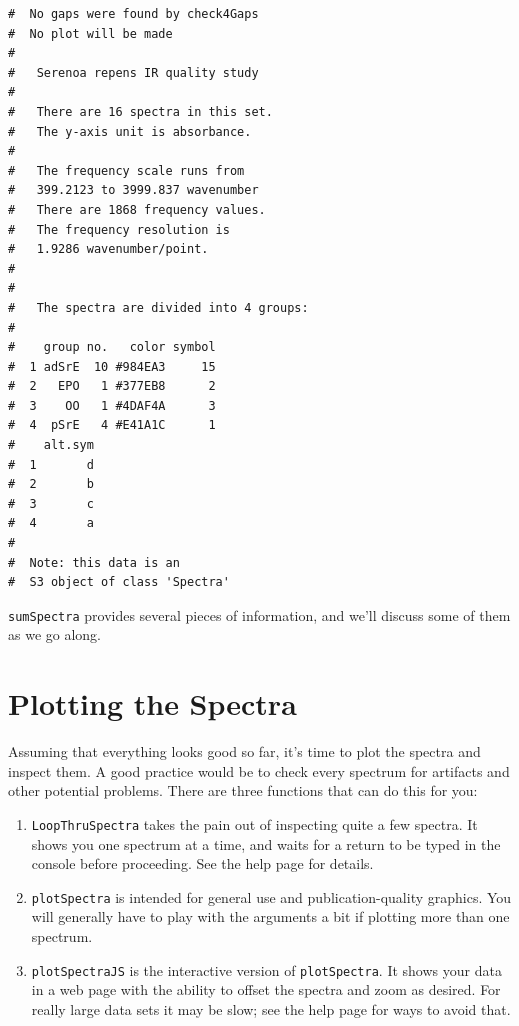 \documentclass[letter,10pt,twocolumn,twoside,printwatermark=false]{pinp}
\begin{document}
\begin{Shaded}
\begin{Highlighting}[]
\end{Highlighting}
\end{Shaded}

\begin{ShadedResult}
\begin{verbatim}
#  No gaps were found by check4Gaps
#  No plot will be made
#  
#   Serenoa repens IR quality study 
#  
#   There are 16 spectra in this set.
#   The y-axis unit is absorbance.
#  
#   The frequency scale runs from
#   399.2123 to 3999.837 wavenumber
#   There are 1868 frequency values.
#   The frequency resolution is
#   1.9286 wavenumber/point.
#  
#  
#   The spectra are divided into 4 groups: 
#  
#    group no.   color symbol
#  1 adSrE  10 #984EA3     15
#  2   EPO   1 #377EB8      2
#  3    OO   1 #4DAF4A      3
#  4  pSrE   4 #E41A1C      1
#    alt.sym
#  1       d
#  2       b
#  3       c
#  4       a
#  
#  Note: this data is an
#  S3 object of class 'Spectra'
\end{verbatim}
\end{ShadedResult}

\texttt{sumSpectra} provides several pieces of information, and we'll
discuss some of them as we go along.

\hypertarget{plotting-the-spectra}{%
\section{Plotting the Spectra}\label{plotting-the-spectra}}

Assuming that everything looks good so far, it's time to plot the
spectra and inspect them. A good practice would be to check every
spectrum for artifacts and other potential problems. There are three
functions that can do this for you:

\begin{enumerate}
  \item \texttt{LoopThruSpectra} takes the pain out of inspecting quite a few spectra.  It shows you one spectrum at a time, and waits for a return to be typed in the console before proceeding.  See the help page for details.
  \item \texttt{plotSpectra} is intended for general use and publication-quality graphics.  You will generally have to play with the arguments a bit if plotting more than one spectrum.
  \item \texttt{plotSpectraJS} is the interactive version of \texttt{plotSpectra}.  It shows your data in a web page with the ability to offset the spectra and zoom as desired.  For really large data sets it may be slow; see the help page for ways to avoid that.
\end{enumerate}
\end{document}
